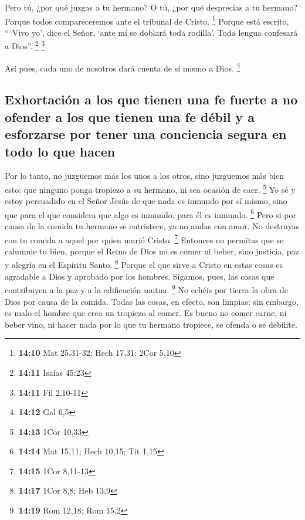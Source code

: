 \begin{paracol}{2}
 Pero tú, ¿por qué juzgas a tu hermano? O tú, ¿por qué
desprecias a tu hermano? Porque todos compareceremos ante el tribunal de
Cristo. \footnote{\textbf{14:10} Mat 25,31-32; Hech 17,31; 2Cor 5,10}
 Porque está escrito, ``\,`Vivo yo', dice el Señor, `ante
mí se doblará toda rodilla'. Toda lengua confesará a Dios''. \footnote{\textbf{14:11}
  Isaías 45:23} \footnote{\textbf{14:11} Fil 2,10-11}

 Así pues, cada uno de nosotros dará cuenta de sí mismo a
Dios. \footnote{\textbf{14:12} Gal 6,5}

\hypertarget{exhortaciuxf3n-a-los-que-tienen-una-fe-fuerte-a-no-ofender-a-los-que-tienen-una-fe-duxe9bil-y-a-esforzarse-por-tener-una-conciencia-segura-en-todo-lo-que-hacen}{%
\subsection{Exhortación a los que tienen una fe fuerte a no ofender a
los que tienen una fe débil y a esforzarse por tener una conciencia
segura en todo lo que
hacen}\label{exhortaciuxf3n-a-los-que-tienen-una-fe-fuerte-a-no-ofender-a-los-que-tienen-una-fe-duxe9bil-y-a-esforzarse-por-tener-una-conciencia-segura-en-todo-lo-que-hacen}}

 Por lo tanto, no juzguemos más los unos a los otros,
sino juzguemos más bien esto: que ninguno ponga tropiezo a su hermano,
ni sea ocasión de caer. \footnote{\textbf{14:13} 1Cor 10,33}
 Yo sé y estoy persuadido en el Señor Jesús de que nada
es inmundo por sí mismo, sino que para el que considera que algo es
inmundo, para él es inmundo. \footnote{\textbf{14:14} Mat 15,11; Hech
  10,15; Tit 1,15}  Pero si por causa de la comida tu
hermano se entristece, ya no andas con amor. No destruyas con tu comida
a aquel por quien murió Cristo. \footnote{\textbf{14:15} 1Cor 8,11-13}
 Entonces no permitas que se calumnie tu bien,
 porque el Reino de Dios no es comer ni beber, sino
justicia, paz y alegría en el Espíritu Santo. \footnote{\textbf{14:17}
  1Cor 8,8; Heb 13,9}  Porque el que sirve a Cristo en
estas cosas es agradable a Dios y aprobado por los hombres.
 Sigamos, pues, las cosas que contribuyen a la paz y a la
edificación mutua. \footnote{\textbf{14:19} Rom 12,18; Rom 15,2}
 No echéis por tierra la obra de Dios por causa de la
comida. Todas las cosas, en efecto, son limpias; sin embargo, es malo el
hombre que crea un tropiezo al comer.  Es bueno no comer
carne, ni beber vino, ni hacer nada por lo que tu hermano tropiece, se
ofenda o se debilite.


\end{paracol}
